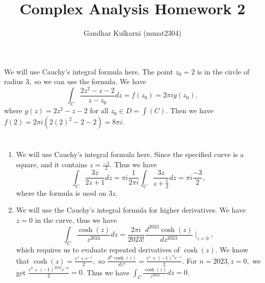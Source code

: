 \documentclass{article}
\title{Complex Analysis Homework 2} %
\author{Gandhar Kulkarni (mmat2304)} %
\date{} %
\begin{document}
\maketitle %


\section{} %
We will use Cauchy's integral formula here. The point $z_0=2$ is in the circle of radius $3,$ so we can use the formula. We have $$\int_C 
\frac{2z^2-z-2}{z-z_0}dz= f(z_0)=2 \pi i g(z_0),$$ where $g(z)=2z^2-z-2$ for all $z_0 \in D= \int(C).$ Then we have $f(2)=2 \pi i (2(2)^2-2-2)=8\pi i.$    
\section{} %
\begin{enumerate}
	\item We will use Cauchy's integral formula here. Since the specified curve is a square, and it contains $z=\frac{-1}{2}.$ 
	Thus we have $$\int_C \frac{3z}{2z+1}dz =\pi i \frac{1}{2 \pi i}\int_C \frac{3z}{z+\frac{1}{2}}dz= \pi i \frac{-3}{2},$$ where the formula 
	is used on $3z.$
	\item We will use the Cauchy's integral formula for higher derivatives. We have $z=0$ in the curve, thus we have 
	$$ \int_C \frac{\cosh (z)}{z^{2024}}dz =\frac{2 \pi i}{2023!}\frac{d^{2023}\cosh(z)}{dz^{2023}} \mid_{z=0},$$
	which requires us to evaluate repeated derivatives of $\cosh(z).$ We know that $\cosh(z)= \frac{e^z + e^{-z}}{2},$ 
	so $\frac{d^n \cosh(z)}{dz^{n}}= \frac{e^z + (-1)^n e^{-z}}{2}.$ For $n=2023, z=0,$ we get 
	$ \frac{e^{0}+ (-1)^{2023}e^{-0}}{2}=0.$ Thus we have $\int_C \frac{\cosh (z)}{z^{2024}}dz=0.$
\end{enumerate}
\end{document}
